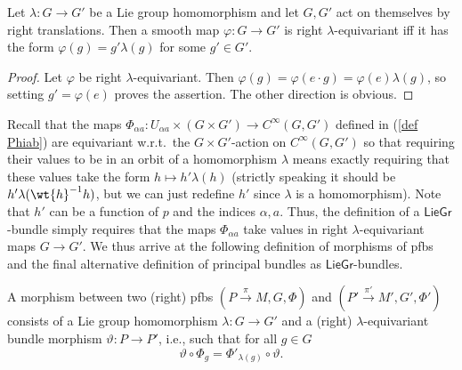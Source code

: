 \begin{prop}
    Let $\lambda:G\to G'$ be a Lie group homomorphism and let $G,G'$ act on themselves by right translations. Then a smooth map $\varphi:G\to G'$ is right $\lambda$-equivariant iff it has the form $\varphi(g)=g'\lambda(g)$ for some $g'\in G'$.
\end{prop}
\begin{proof}
    Let $\varphi$ be right $\lambda$-equivariant. Then
    $\varphi(g)=\varphi(e\cdot g)=\varphi(e)\lambda(g)$,
    so setting $g'=\varphi(e)$ proves the assertion. The other direction is obvious.
\end{proof}


Recall that the maps $\Phi_{\alpha a}:U_{\alpha a}\times (G\times G')\to C^\infty(G,G')$ defined in (\ref{def Phiab}) are equivariant w.r.t.\ the $G\times G'$-action on $C^\infty(G,G')$ so that requiring their values to be in an orbit of a homomorphism $\lambda$ means exactly requiring that these values take the form $h\mapsto h'\lambda (h)$ (strictly speaking it should be $h'\lambda(\wt{h}^{-1}h)$, but we can just redefine $h'$ since $\lambda$ is a homomorphism). Note that $h'$ can be a function of $p$ and the indices $\alpha,a$. Thus, the definition of a $\mathsf{LieGr}$-bundle simply requires that the maps $\Phi_{\alpha a}$ take values in right $\lambda$-equivariant maps $G\to G'$. We thus arrive at the following definition of morphisms of \glspl{pfb} and the final alternative definition of principal bundles as $\mathsf{LieGr}$-bundles.



\begin{defn}
    A morphism between two (right) \glspl{pfb} $(P\overset{\pi}{\to}M,G,\Phi)$ and $(P'\overset{\pi'}{\to}M',G',\Phi')$ consists of a Lie group homomorphism $\lambda:G\to G'$ and a (right) $\lambda$-equivariant bundle morphism $\vartheta:P\to P'$, i.e., such that for all $g\in G$
    \[\vartheta\circ \Phi_{g}=\Phi'_{\lambda(g)}\circ \vartheta.\]
\end{defn}

